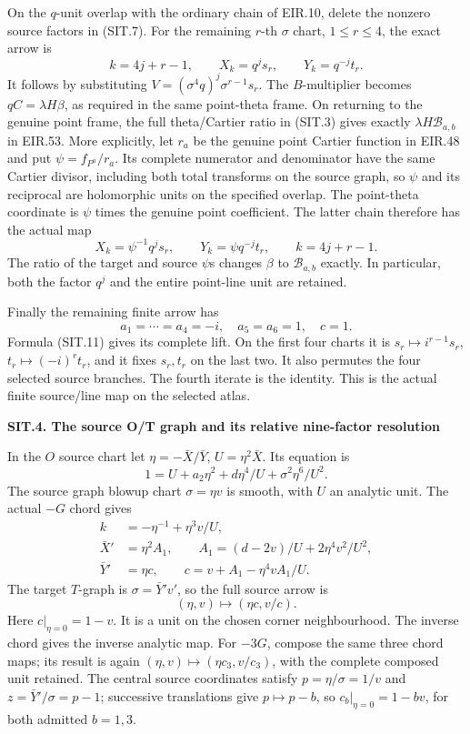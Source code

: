 On the \(q\)-unit overlap with the ordinary chain of EIR.10,
delete the nonzero source factors in (SIT.7). For the remaining
\(r\)-th \(\sigma\) chart, \(1\le r\le4\), the exact arrow is
\[
 k=4j+r-1,\qquad X_k=q^j s_r,\qquad Y_k=q^{-j}t_r.
 \tag{SIT.16}
\]
It follows by substituting
\(V=(\sigma^4q)^j\sigma^{r-1}s_r\).
The \(B\)-multiplier becomes \(qC=\lambda H\beta\), as
required in the same point-theta frame. On returning to the
genuine point frame, the full theta/Cartier ratio in (SIT.3)
gives exactly \(\lambda H\mathcal B_{a,b}\) in EIR.53.
More explicitly, let \(r_a\) be the genuine point Cartier
function in EIR.48 and put
\(\psi=f_{P^a}/r_a\). Its complete numerator and denominator
have the same Cartier divisor, including both total transforms
on the source graph, so \(\psi\) and its reciprocal are
holomorphic units on the specified overlap. The point-theta
coordinate is \(\psi\) times the genuine point coefficient.
The latter chain therefore has the actual map
\[
 X_k=\psi^{-1}q^js_r,\qquad
 Y_k=\psi q^{-j}t_r,\qquad k=4j+r-1.
 \tag{SIT.16a}
\]
The ratio of the target and source \(\psi\)\textquotesingle s changes
\(\beta\) to \(\mathcal B_{a,b}\) exactly. In particular, both
the factor \(q^j\) and the entire point-line unit are retained.

Finally the remaining finite arrow has
\[
 a_1=\cdots=a_4=-i,\quad a_5=a_6=1,\quad c=1.
 \tag{SIT.17}
\]
Formula (SIT.11) gives its complete lift. On the first four
charts it is \(s_r\mapsto i^{r-1}s_r\),
\(t_r\mapsto(-i)^r t_r\), and it fixes \(s_r,t_r\) on
the last two. It also permutes the four selected source
branches. The fourth iterate is the identity. This is the
actual finite source/line map on the selected atlas.

\par

\medskip\noindent\textbf{SIT.4. The source O/T graph and its relative nine-factor resolution}

\par\nobreak

In the \(O\) source chart let
\(\eta=-\bar X/\bar Y\), \(U=\eta^2\bar X\). Its equation is
\[
 1=U+a_2\eta^2+d\eta^4/U+\sigma^2\eta^6/U^2 .
 \tag{SIT.18}
\]
The source graph blowup chart \(\sigma=\eta v\) is smooth,
with \(U\) an analytic unit. The actual \(-G\) chord gives
\[
 \begin{aligned}
 k&=-\eta^{-1}+\eta^3v/U,\\
 \bar X'&=\eta^2 A_1,\qquad
 A_1=(d-2v)/U+2\eta^4v^2/U^2,\\
 \bar Y'&=\eta c,\qquad
 c=v+A_1-\eta^4vA_1/U.
 \end{aligned}
 \tag{SIT.19}
\]
The target \(T\)-graph is \(\sigma=\bar Y'v'\), so the full
source arrow is
\[
 (\eta,v)\longmapsto(\eta c,v/c).
 \tag{SIT.20}
\]
Here \(c|_{\eta=0}=1-v\). It is a unit on the chosen corner
neighbourhood. The inverse chord gives the inverse analytic
map. For \(-3G\), compose the same three chord maps; its
result is again \((\eta,v)\mapsto(\eta c_3,v/c_3)\), with
the complete composed unit retained. The central source
coordinates satisfy \(p=\eta/\sigma=1/v\) and
\(z=\bar Y'/\sigma=p-1\); successive translations give
\(p\mapsto p-b\), so \(c_b|_{\eta=0}=1-bv\), for
both admitted \(b=1,3\).

